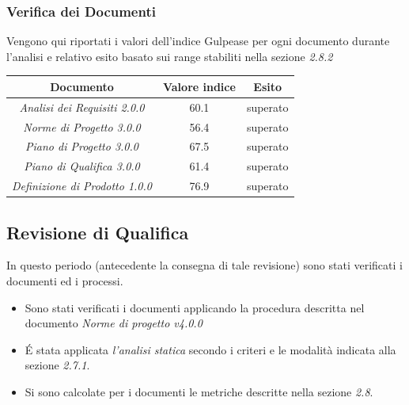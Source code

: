 {  \subsubsection{Verifica dei Documenti}
  Vengono qui riportati i valori dell'indice Gulpease per ogni documento durante l’analisi e relativo
  esito basato sui range stabiliti nella sezione \emph{2.8.2}
  \begin{center}
    \begin{tabular}{|c|c|c|}
      \hline
      \textbf{Documento} & \textbf{Valore indice} & \textbf{Esito} \\
      \hline
      \emph{Analisi dei Requisiti 2.0.0}  & 60.1 & superato \\
      \hline
      \emph{Norme di Progetto 3.0.0}   & 56.4  & superato \\
      \hline
      \emph{Piano di Progetto 3.0.0}   & 67.5 & superato \\
      \hline
      \emph{Piano di Qualifica 3.0.0}   & 61.4 & superato \\
      \hline
      \emph{Definizione di Prodotto 1.0.0}  & 76.9 & superato \\
      \hline
    \end{tabular}
  \end{center}
  
  
  
  \subsection{Revisione di Qualifica}
  
    In questo periodo (antecedente la consegna di tale revisione) sono stati verificati i documenti ed i processi.
    
    \begin{itemize}
    	\item Sono stati verificati i documenti applicando la procedura descritta nel documento \emph{Norme di progetto v4.0.0}
    	\item \'E stata applicata \emph{l'analisi statica} secondo i criteri e le modalità indicata alla sezione \emph{2.7.1}.
    	\item Si sono calcolate per i documenti le metriche descritte nella sezione \emph{2.8}.
   

\end{itemize}}
